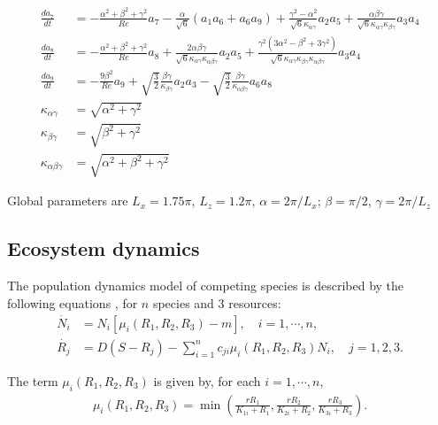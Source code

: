 \documentclass[preprint,superscriptaddress,
nofootinbib,amsmath,amssymb,aps]{revtex4-1}
\begin{document}
\begin{align*}
\frac{da_7}{dt} &= -\frac{\alpha^2 + \beta^2 + \gamma^2}{Re} a_7 - \frac{\alpha}{\sqrt{6}}(a_1 a_6 + a_6 a_9) + \frac{\gamma^2 - \alpha^2}{\sqrt{6}\kappa_{\alpha\gamma}}a_2 a_5 + \frac{\alpha\beta\gamma}{\sqrt{6}\kappa_{\alpha\gamma}\kappa_{\beta\gamma}}a_3 a_4\\
\frac{da_8}{dt} &= -\frac{\alpha^2 + \beta^2 + \gamma^2}{Re} a_8 + \frac{2\alpha\beta\gamma}{\sqrt{6}\kappa_{\alpha\gamma}\kappa_{\alpha\beta\gamma}} a_2 a_5  + \frac{\gamma^2(3\alpha^2 - \beta^2 + 3\gamma^2)}{\sqrt{6} \kappa_{\alpha\gamma}\kappa_{\beta\gamma}\kappa_{\alpha\beta\gamma}}a_3 a_4\\
\frac{da_9}{dt} &= -\frac{9\beta^2}{Re} a_9 + \sqrt{\frac{3}{2}}\frac{\beta \gamma}{\kappa_{\beta\gamma}}a_2 a_3 - \sqrt{\frac{3}{2}}\frac{\beta\gamma}{\kappa_{\alpha\beta\gamma}}a_6 a_8\\
\kappa_{\alpha\gamma} &= \sqrt{\alpha^2 + \gamma^2}\\
\kappa_{\beta\gamma} &= \sqrt{\beta^2 + \gamma^2}\\
\kappa_{\alpha\beta\gamma} &= \sqrt{\alpha^2+ \beta^2 + \gamma^2}
\end{align*}

Global parameters are    $L_x = 1.75\pi$, $L_z = 1.2\pi$, $\alpha = 2\pi/L_x$; $\beta = \pi/2$,  $\gamma = 2\pi/L_z$ 



\subsection*{Ecosystem dynamics}
The population dynamics model of competing species is described by the following equations \cite{huisman2001fundamental}, for $n$ species and $3$ resources:
\begin{align*}
    \dot{N_i} &= N_i [\mu_i(R_1, R_2, R_3) - m ], \quad i = 1, \cdots, n, \\
    \dot{R_j} &= D (S - R_j) - \sum_{i=1}^n c_{ji} \mu_i(R_1, R_2, R_3) N_i, \quad j = 1, 2, 3.
\end{align*}

The term $\mu_i(R_1, R_2, R_3)$ is given by, for each $i = 1, \cdots, n$,
\begin{align*}
    \mu_i(R_1, R_2, R_3) = \min\left( \frac{r R_1}{K_{1i} + R_1}, \frac{r R_2}{K_{2i} + R_2}, \frac{r R_3}{K_{3i} + R_3} \right).
\end{align*}
\end{document}
